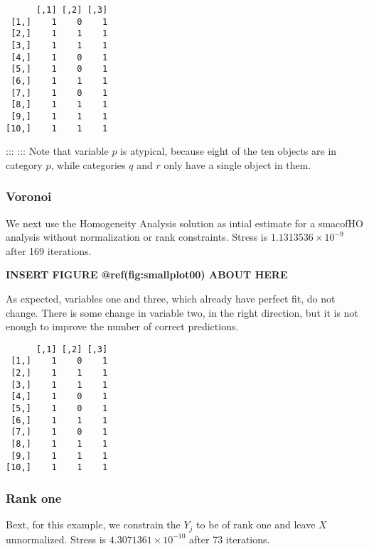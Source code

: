 \documentclass[
  12pt,
  letterpaper,
  DIV=11,
  numbers=noendperiod]{scrartcl}
\begin{document}
\begin{verbatim}
      [,1] [,2] [,3]
 [1,]    1    0    1
 [2,]    1    1    1
 [3,]    1    1    1
 [4,]    1    0    1
 [5,]    1    0    1
 [6,]    1    1    1
 [7,]    1    0    1
 [8,]    1    1    1
 [9,]    1    1    1
[10,]    1    1    1
\end{verbatim}

::: ::: Note that variable \(p\) is atypical, because eight of the ten
objects are in category \(p\), while categories \(q\) and \(r\) only
have a single object in them.

\subsubsection{Voronoi}\label{voronoi}

We next use the Homogeneity Analysis solution as intial estimate for a
smacofHO analysis without normalization or rank constraints. Stress is
\ensuremath{1.1313536\times 10^{-9}} after 169 iterations.

\begin{greybox}

\begin{center}
\textbf{INSERT FIGURE @ref(fig:smallplot00) ABOUT HERE}

\end{center}

\end{greybox}

As expected, variables one and three, which already have perfect fit, do
not change. There is some change in variable two, in the right
direction, but it is not enough to improve the number of correct
predictions.

\begin{verbatim}
      [,1] [,2] [,3]
 [1,]    1    0    1
 [2,]    1    1    1
 [3,]    1    1    1
 [4,]    1    0    1
 [5,]    1    0    1
 [6,]    1    1    1
 [7,]    1    0    1
 [8,]    1    1    1
 [9,]    1    1    1
[10,]    1    1    1
\end{verbatim}

\subsubsection{Rank one}\label{rank-one}

Bext, for this example, we constrain the \(Y_j\) to be of rank one and
leave \(X\) unnormalized. Stress is
\ensuremath{4.3071361\times 10^{-10}} after 73 iterations.
\end{document}

